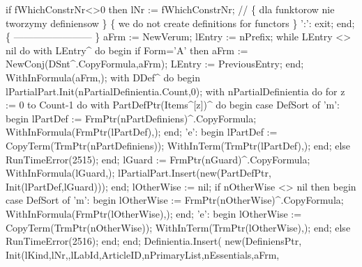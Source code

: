                               if fWhichConstrNr<>0 then lNr := fWhichConstrNr;
               //        \{ dla funktorow nie tworzymy definiensow \}
                         \{ we do not create definitions for functors \}
               ':': exit;
            end;
            \{ ------------------------ \}
            aFrm := NewVerum; lEntry := nPrefix;
            while LEntry <> nil do with LEntry^ do
            begin
               if Form='A' then aFrm := NewConj(DSnt^.CopyFormula,aFrm);
               LEntry := PreviousEntry;
            end;
            WithInFormula(aFrm,);
            with DDef^ do
            begin lPartialPart.Init(nPartialDefinientia.Count,0);
            with nPartialDefinientia do
               for z := 0 to Count-1 do
                  with PartDefPtr(Items^[z])^ do
               begin
                  case DefSort of
                     'm':
                        begin
                           lPartDef := FrmPtr(nPartDefiniens)^.CopyFormula;
                           WithInFormula(FrmPtr(lPartDef),);
                        end;
                     'e':
                        begin
                           lPartDef := CopyTerm(TrmPtr(nPartDefiniens));
                           WithInTerm(TrmPtr(lPartDef),);
                        end;
                  else RunTimeError(2515);
                  end;
                  lGuard := FrmPtr(nGuard)^.CopyFormula;
                  WithInFormula(lGuard,);
                  lPartialPart.Insert(new(PartDefPtr, Init(lPartDef,lGuard)));
               end;
            lOtherWise := nil;
            if nOtherWise <> nil then
            begin
               case DefSort of
                  'm':
                     begin
                        lOtherWise := FrmPtr(nOtherWise)^.CopyFormula;
                        WithInFormula(FrmPtr(lOtherWise),);
                     end;
                  'e':
                     begin
                        lOtherWise := CopyTerm(TrmPtr(nOtherWise));
                        WithInTerm(TrmPtr(lOtherWise),);
                     end;
               else RunTimeError(2516);
               end;
            end;
            Definientia.Insert(
               new(DefiniensPtr,
                   Init(lKind,lNr,,lLabId,ArticleID,nPrimaryList,nEssentials,aFrm,
